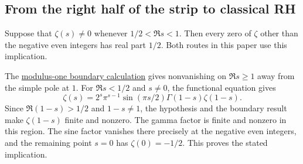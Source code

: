 \subsection*{From the right half of the strip to classical RH}
%
Suppose that \(\zeta(s)\ne0\) whenever \(1/2<\Re s<1\).
Then every zero of \(\zeta\) other than the negative even integers
has real part \(1/2\). Both routes in this paper use this implication.

The \hyperlink{proof.dirichlet-zero-free-line}{modulus-one boundary
calculation} gives nonvanishing on \(\Re s\ge1\) away from the
simple pole at \(1\).
For \(\Re s<1/2\) and \(s\ne0\), the functional equation gives
\[
  \zeta(s)=2^s\pi^{s-1}\sin(\pi s/2)\Gamma(1-s)\zeta(1-s).
\]
Since \(\Re(1-s)>1/2\) and \(1-s\ne1\), the hypothesis and the
boundary result make \(\zeta(1-s)\) finite and nonzero.
The gamma factor is finite and nonzero in this region.
The sine factor vanishes there precisely at the negative even integers,
and the remaining point \(s=0\) has \(\zeta(0)=-1/2\).
\cite[(25.4.2), (25.6.1) and \S5.2(i)]{dlmf}
This proves the stated implication.
